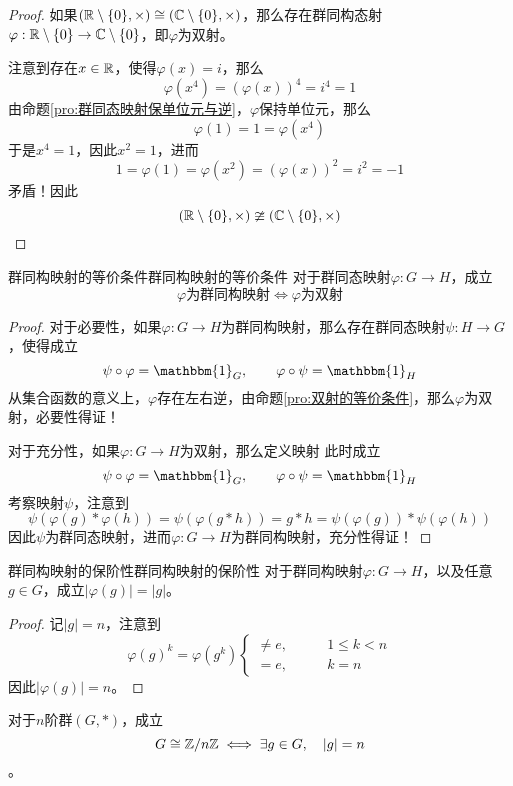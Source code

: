 \begin{proof}
	如果$(\mathbb{R}\setminus\{0\},\times)\cong (\mathbb{C}\setminus\{0\},\times)$，那么存在群同构态射$\varphi:\mathbb{R}\setminus\{0\}\to\mathbb{C}\setminus\{0\}$，即$\varphi$为双射。
	
	注意到存在$x\in\mathbb{R}$，使得$\varphi(x)=i$，那么
	$$
	\varphi(x^4)=(\varphi(x))^4=i^4=1
	$$
	由命题\ref{pro:群同态映射保单位元与逆}，$\varphi$保持单位元，那么
	$$
	\varphi(1)=1=\varphi(x^4)
	$$
	于是$x^4=1$，因此$x^2=1$，进而
	$$
	1=\varphi(1)=\varphi(x^2)=(\varphi(x))^2=i^2=-1
	$$
	矛盾！因此
	\[ 
	(\mathbb{R}\setminus\{0\},\times)\ncong (\mathbb{C}\setminus\{0\},\times) 
	\]
\end{proof}

\begin{theorem}{群同构映射的等价条件}{群同构映射的等价条件}
	对于群同态映射$\varphi:G\to H$，成立
	$$
	\varphi\text{为群同构映射}\iff \varphi\text{为双射}
	$$
\end{theorem}

\begin{proof}
	对于必要性，如果$\varphi:G\to H$为群同构映射，那么存在群同态映射$\psi:H\to G$，使得成立
	$$
	\psi\circ \varphi=\mathbbm{1}_{G},\qquad
	\varphi\circ \psi=\mathbbm{1}_{H}
	$$
	从集合函数的意义上，$\varphi$存在左右逆，由命题\ref{pro:双射的等价条件}，那么$\varphi$为双射，必要性得证！
	
	对于充分性，如果$\varphi:G\to H$为双射，那么定义映射
	此时成立
	$$
	\psi\circ \varphi=\mathbbm{1}_{G},\qquad
	\varphi\circ \psi=\mathbbm{1}_{H}
	$$
	考察映射$\psi$，注意到
	$$
	\psi(\varphi(g)*\varphi(h))
	=\psi(\varphi(g*h))
	=g*h
	=\psi(\varphi(g))*\psi(\varphi(h))
	$$
	因此$\psi$为群同态映射，进而$\varphi:G\to H$为群同构映射，充分性得证！
\end{proof}

\begin{proposition}{群同构映射的保阶性}{群同构映射的保阶性}
	对于群同构映射$\varphi:G\to H$，以及任意$g\in G$，成立$|\varphi(g)|=|g|$。
\end{proposition}

\begin{proof}
	记$|g|=n$，注意到
	\[ 
	\varphi(g)^k=\varphi(g^k)\begin{cases}
		\ne e,\qquad & 1\le k<n\\
		=e,\qquad & k=n
	\end{cases}
	 \]
	 因此$|\varphi(g)|=n$。
\end{proof}

\begin{proposition}
	对于$n$阶群$(G,*)$，成立\[ G\cong \mathbb{Z}/n\mathbb{Z}\iff \exists g\in G,\quad |g|=n \]。
\end{proposition}

